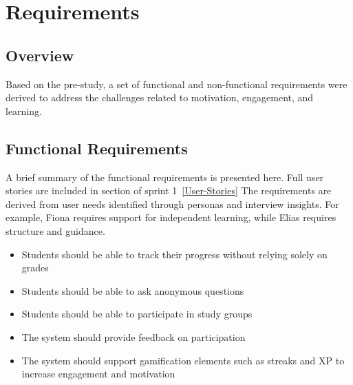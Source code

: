
\section{Requirements}

\subsection{Overview}
Based on the pre-study, a set of functional and non-functional requirements were derived
to address the challenges related to motivation, engagement, and learning.

\subsection{Functional Requirements}
A brief summary of the functional requirements is presented here.
Full user stories are included in section of sprint 1~\ref{User-Stories}
The requirements are derived from user needs identified through personas
and interview insights.
For example, Fiona requires support for independent learning,
while Elias requires structure and guidance.

\begin{itemize}
    \item Students should be able to track their progress without relying solely on grades
    \item Students should be able to ask anonymous questions
    \item Students should be able to participate in study groups
    \item The system should provide feedback on participation
    \item The system should support gamification elements such as streaks and XP to increase engagement and motivation
\end{itemize}

